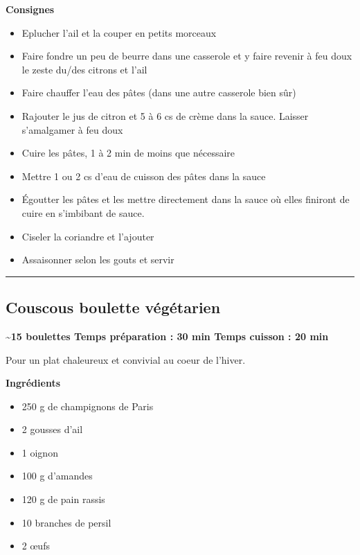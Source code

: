 \documentclass[]{book}
\providecommand{\tightlist}{%
  \setlength{\itemsep}{0pt}\setlength{\parskip}{0pt}}
\begin{document}
\textbf{Consignes}

\begin{itemize}
\tightlist
\item
  Eplucher l'ail et la couper en petits morceaux
\item
  Faire fondre un peu de beurre dans une casserole et y faire revenir à feu doux le zeste du/des citrons et l'ail
\item
  Faire chauffer l'eau des pâtes (dans une autre casserole bien sûr)
\item
  Rajouter le jus de citron et 5 à 6 cs de crème dans la sauce. Laisser s'amalgamer à feu doux
\item
  Cuire les pâtes, 1 à 2 min de moins que nécessaire
\item
  Mettre 1 ou 2 cs d'eau de cuisson des pâtes dans la sauce
\item
  Égoutter les pâtes et les mettre directement dans la sauce où elles finiront de cuire en s'imbibant de sauce.
\item
  Ciseler la coriandre et l'ajouter
\item
  Assaisonner selon les gouts et servir
\end{itemize}

\begin{center}\rule{0.5\linewidth}{0.5pt}\end{center}

\hypertarget{couscous-boulette-vuxe9guxe9tarien}{%
\subsection*{\texorpdfstring{{Couscous boulette végétarien}}{Couscous boulette végétarien}}\label{couscous-boulette-vuxe9guxe9tarien}}

\begin{salebox}
\textbf{\textasciitilde{}15 boulettes \textbar{} Temps préparation : 30
min \textbar{} Temps cuisson : 20 min}

Pour un plat chaleureux et convivial au coeur de l'hiver.
\end{salebox}

\textbf{Ingrédients}

\begin{itemize}
\tightlist
\item
  250 g de champignons de Paris
\item
  2 gousses d'ail
\item
  1 oignon
\item
  100 g d'amandes
\item
  120 g de pain rassis
\item
  10 branches de persil
\item
  2 œufs
\end{itemize}
\end{document}
